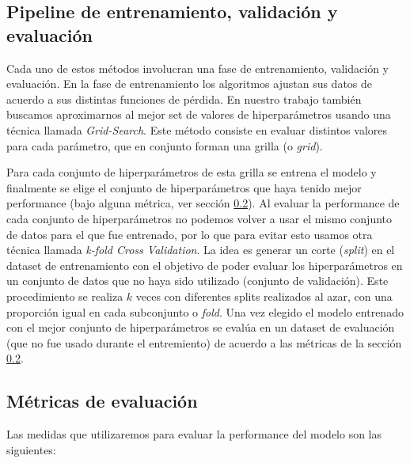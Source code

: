 \subsection{Pipeline de entrenamiento, validación y evaluación} \label{pipeline}

Cada uno de estos métodos involucran una fase de entrenamiento, validación y evaluación. En la fase de entrenamiento los algoritmos ajustan sus datos de acuerdo a sus distintas funciones de pérdida. En nuestro trabajo también buscamos aproximarnos al mejor set de valores de hiperparámetros usando una técnica llamada \textit{Grid-Search}. Este método consiste en evaluar distintos valores para cada parámetro, que en conjunto forman una grilla (o \textit{grid}). 

Para cada conjunto de hiperparámetros de esta grilla se entrena el modelo y finalmente se elige el conjunto de hiperparámetros que haya tenido mejor performance (bajo alguna métrica, ver sección \ref{eval_metrics}). Al evaluar la performance de cada conjunto de hiperparámetros no podemos volver a usar el mismo conjunto de datos para el que fue entrenado, por lo que para evitar esto usamos otra técnica llamada \textit{k-fold Cross Validation}. La idea es generar un corte (\textit{split}) en el dataset de entrenamiento con el objetivo de poder evaluar los hiperparámetros en un conjunto de datos que no haya sido utilizado (conjunto de validación). Este procedimiento se realiza $k$ veces con diferentes splits realizados al azar, con una proporción igual en cada subconjunto o \textit{fold}. Una vez elegido el modelo entrenado con el mejor conjunto de hiperparámetros se evalúa en un dataset de evaluación (que no fue usado durante el entremiento) de acuerdo a las métricas de la sección \ref{eval_metrics}.


\subsection{Métricas de evaluación} \label{eval_metrics}

Las medidas que utilizaremos para evaluar la performance del modelo son las siguientes:

